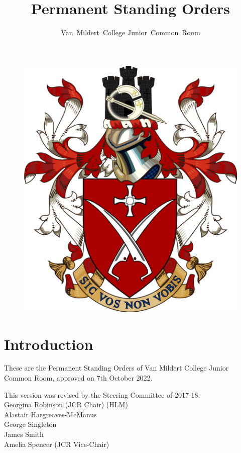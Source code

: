 \documentclass[12pt]{article}
\title{Permanent Standing Orders}
\author{Van~Mildert~College Junior~Common~Room}
\date{\thedate}
\newcommand{\thedate}{7th October 2022}
\begin{document}
\begin{titlepage}  %
    \maketitle
    \begin{figure}[h]
    \includegraphics[scale=0.25]{arms}  %
    \centering
    \end{figure}
    \thispagestyle{empty}
\end{titlepage}

\setcounter{page}{2}  %
\section*{Introduction}
These are the Permanent Standing Orders of Van Mildert College Junior Common Room, approved on \thedate.

This version was revised by the Steering Committee of 2017-18:\\
\hspace*{2cm}Georgina Robinson (JCR Chair) (HLM)\\
\hspace*{2cm}Alastair Hargreaves-McManus\\
\hspace*{2cm}George Singleton\\
\hspace*{2cm}James Smith\\
\hspace*{2cm}Amelia Spencer (JCR Vice-Chair)
\end{document}
